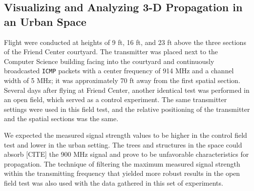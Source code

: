 \documentclass[pageno]{jpaper}
\begin{document}
\subsection{Visualizing and Analyzing 3-D Propagation in an Urban Space}
Flight were conducted at heights of 9 ft, 16 ft, and 23 ft above the three sections of the Friend Center courtyard. The transmitter was placed next to the Computer Science building facing into the courtyard and continuously broadcasted \texttt{ICMP} packets with a center frequency of 914 MHz and a channel width of 5 MHz; it was approximately 70 ft away from the first spatial section. Several days after flying at Friend Center, another identical test was performed in an open field, which served as a control experiment. The same transmitter settings were used in this field test, and the relative positioning of the transmitter and the spatial sections was the same. 

We expected the measured signal strength values to be higher in the control field test and lower in the urban setting. The trees and structures in the space could absorb [CITE] the 900 MHz signal and prove to be unfavorable characteristics for propagation. The technique of filtering the maximum measured signal strength within the transmitting frequency that yielded more robust results in the open field test was also used with the data gathered in this set of experiments. 
\end{document}
